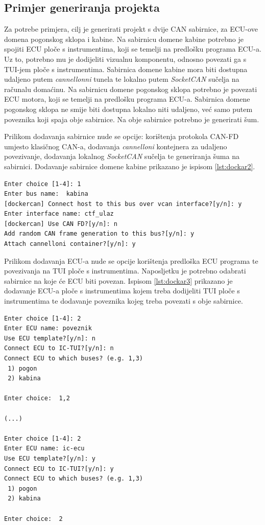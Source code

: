 \documentclass[times, utf8, diplomski, numeric]{fer}
\begin{document}
\subsection{Primjer generiranja projekta}
Za potrebe primjera, cilj je generirati projekt s dvije CAN sabirnice, za ECU-ove domena pogonskog sklopa i kabine. Na sabirnicu domene kabine potrebno je spojiti ECU ploče s instrumentima, koji se temelji na predlošku programa ECU-a. Uz to, potrebno mu je dodijeliti vizualnu komponentu, odnosno povezati ga s TUI-jem ploče s instrumentima. Sabirnica domene kabine mora biti dostupna udaljeno putem \textit{cannellonni} tunela te lokalno putem \textit{SocketCAN} sučelja na računalu domaćinu. Na sabirnicu domene pogonskog sklopa potrebno je povezati ECU motora, koji se temelji na predlošku programa ECU-a. Sabirnica domene pogonskog sklopa ne smije biti dostupna lokalno niti udaljeno, već samo putem poveznika koji spaja obje sabirnice. Na obje sabirnice potrebno je generirati šum.

Prilikom dodavanja sabirnice nude se opcije: korištenja protokola CAN-FD umjesto klasičnog CAN-a, dodavanja \textit{cannelloni} kontejnera za udaljeno povezivanje, dodavanja lokalnog \textit{SocketCAN} sučelja te generiranja šuma na sabirnici. Dodavanje sabirnice domene kabine prikazano je ispisom \ref{lst:dockar2}.
\bigskip
\begin{lstlisting}[style=terminal, label={lst:dockar2},caption={Dodavanje sabirnice}]
Enter choice [1-4]: 1
Enter bus name:  kabina
[dockercan] Connect host to this bus over vcan interface?[y/n]: y
Enter interface name: ctf_ulaz
[dockercan] Use CAN FD?[y/n]: n
Add random CAN frame generation to this bus?[y/n]: y
Attach cannelloni container?[y/n]: y
\end{lstlisting}

Prilikom dodavanja ECU-a nude se opcije korištenja predloška ECU programa te povezivanja na TUI ploče s instrumentima. Naposljetku je potrebno odabrati sabirnice na koje će ECU biti povezan. Ispisom \ref{lst:dockar3} prikazano je dodavanje ECU-a ploče s instrumentima kojem treba dodijeliti TUI ploče s instrumentima te dodavanje poveznika kojeg treba povezati s obje sabirnice.
\bigskip
\begin{lstlisting}[style=terminal, label={lst:dockar3},caption={Dodavanje ECU-a}]
Enter choice [1-4]: 2
Enter ECU name: poveznik
Use ECU template?[y/n]: n
Connect ECU to IC-TUI?[y/n]: n
Connect ECU to which buses? (e.g. 1,3)
 1) pogon
 2) kabina

Enter choice:  1,2

(...)

Enter choice [1-4]: 2
Enter ECU name: ic-ecu
Use ECU template?[y/n]: y
Connect ECU to IC-TUI?[y/n]: y
Connect ECU to which buses? (e.g. 1,3)
 1) pogon
 2) kabina

Enter choice:  2
\end{lstlisting}
\newpage
\end{document}
